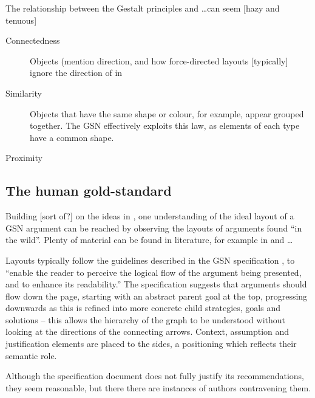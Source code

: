 The relationship between the Gestalt principles and \ldots can seem [hazy and tenuous]

\begin{description}
    \item[Connectedness] Objects (mention direction, and how force-directed layouts [typically] ignore the direction of in

    \item[Similarity] Objects that have the same shape or colour, for example, appear grouped together.
    The GSN effectively exploits this law, as elements of each type have a common shape.
    
    \item[Proximity]
    
\end{description}



\subsection{The human gold-standard }

Building [sort of?] on the ideas in \cite{5674033}, one understanding of the ideal layout of a GSN argument can be reached by observing the layouts of arguments found ``in the wild''.
Plenty of material can be found in literature, for example in \cite{Habli:2006:PPC:1183088.1183090} and  \cite{insilico} \ldots

Layouts typically follow the guidelines described in the GSN specification \citep[section~2.2, pp.~26--27]{gsnstandard}, 
to ``enable the reader to perceive the logical flow of the argument being presented, and to enhance its readability.''
The specification suggests that arguments should flow down the page, starting with an abstract parent goal at the top, progressing downwards as this is refined into more concrete child strategies, goals and solutions -- this allows the hierarchy of the graph to be understood without looking at the directions of the connecting arrows.
Context, assumption and justification elements are placed to the sides, a positioning which reflects their semantic role.

Although the specification document does not fully justify its recommendations, they seem reasonable, but there there are instances of authors contravening them.

